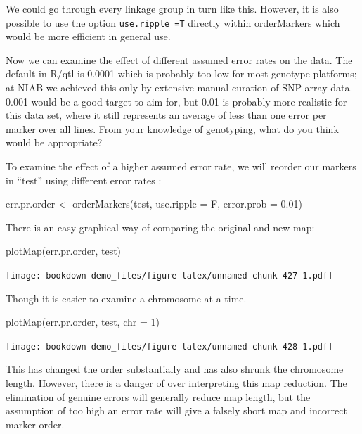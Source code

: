 \documentclass[
]{book}
\newenvironment{Shaded}{\begin{snugshade}}{\end{snugshade}}
\newcommand{\AttributeTok}[1]{\textcolor[rgb]{0.77,0.63,0.00}{#1}}
\newcommand{\DecValTok}[1]{\textcolor[rgb]{0.00,0.00,0.81}{#1}}
\newcommand{\FloatTok}[1]{\textcolor[rgb]{0.00,0.00,0.81}{#1}}
\newcommand{\FunctionTok}[1]{\textcolor[rgb]{0.00,0.00,0.00}{#1}}
\newcommand{\NormalTok}[1]{#1}
\newcommand{\OtherTok}[1]{\textcolor[rgb]{0.56,0.35,0.01}{#1}}
\begin{document}
We could go through every linkage group in turn like this. However, it is also possible to use the option \texttt{use.ripple\ =T} directly within orderMarkers which would be more efficient in general use.

Now we can examine the effect of different assumed error rates on the data. The default in R/qtl is 0.0001 which is probably too low for most genotype platforms; at NIAB we achieved this only by extensive manual curation of SNP array data. 0.001 would be a good target to aim for, but 0.01 is probably more realistic for this data set, where it still represents an average of less than one error per marker over all lines. From your knowledge of genotyping, what do you think would be appropriate?

To examine the effect of a higher assumed error rate, we will reorder our markers in ``test'' using different error rates :

\begin{Shaded}
\begin{Highlighting}[]
\NormalTok{err.pr.order }\OtherTok{\textless{}{-}} \FunctionTok{orderMarkers}\NormalTok{(test, }\AttributeTok{use.ripple =}\NormalTok{ F, }\AttributeTok{error.prob =} \FloatTok{0.01}\NormalTok{)}
\end{Highlighting}
\end{Shaded}

There is an easy graphical way of comparing the original and new map:

\begin{Shaded}
\begin{Highlighting}[]
\FunctionTok{plotMap}\NormalTok{(err.pr.order, test)}
\end{Highlighting}
\end{Shaded}

\texttt{[image: bookdown-demo\_files/figure-latex/unnamed-chunk-427-1.pdf]}

Though it is easier to examine a chromosome at a time.

\begin{Shaded}
\begin{Highlighting}[]
\FunctionTok{plotMap}\NormalTok{(err.pr.order, test, }\AttributeTok{chr =} \DecValTok{1}\NormalTok{)}
\end{Highlighting}
\end{Shaded}

\texttt{[image: bookdown-demo\_files/figure-latex/unnamed-chunk-428-1.pdf]}

This has changed the order substantially and has also shrunk the chromosome length. However, there is a danger of over interpreting this map reduction. The elimination of genuine errors will generally reduce map length, but the assumption of too high an error rate will give a falsely short map and incorrect marker order.
\end{document}
